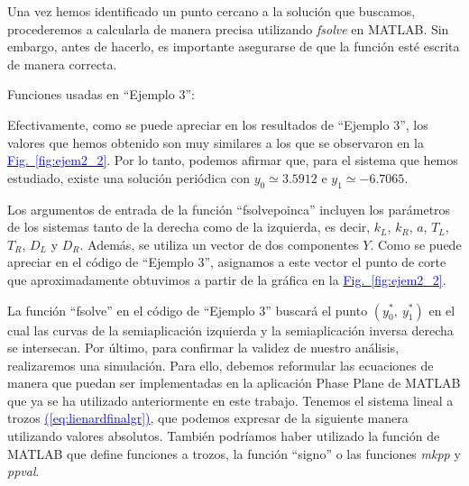 \documentclass[12pt,a4paper]{report} %
\newcommand{\fref}[1]{\hyperref[#1]{\textcolor{blue}{Fig.~\ref*{#1}}}}
\newcommand{\eref}[1]{\hyperref[#1]{\textcolor{blue}{(\ref*{#1})}}}
\newcommand{\fref}[1]{\hyperref[#1]{\textcolor{blue}{\textit{Fig.~\ref*{#1}}}}}
\newcommand{\eref}[1]{\hyperref[#1]{\textcolor{blue}{\textit{(\ref*{#1})}}}}
\begin{document}
	Una vez hemos identificado un punto cercano a la solución que buscamos, procederemos a calcularla de manera precisa utilizando \textit{fsolve} en MATLAB. Sin embargo, antes de hacerlo, es importante asegurarse de que la función esté escrita de manera correcta.
		
	\vspace{1cm}
	
	\vspace{1cm}
	
	\newpage
	
	\noindent Funciones usadas en ``Ejemplo 3'':
	\vspace{0.5cm}
	\vspace{0.5cm}
	
	\vspace{1cm} Efectivamente, como se puede apreciar en los resultados de ``Ejemplo 3'', los valores que hemos obtenido son muy similares a los que se observaron en la \fref{fig:ejem2_2}. Por lo tanto, podemos afirmar que, para el sistema que hemos estudiado, existe una solución periódica con $y_0\simeq3.5912$ e $y_1\simeq-6.7065$.

	
	\vspace{0.5cm}Los argumentos de entrada de la función ``fsolvepoinca'' incluyen los parámetros de los sistemas tanto de la derecha como de la izquierda, es decir, $k_L$, $k_R$, $a$, $T_L$, $T_R$, $D_L$ y $D_R$. Además, se utiliza un vector de dos componentes $Y$. Como se puede apreciar en el código de ``Ejemplo 3'', asignamos a este vector el punto de corte que aproximadamente obtuvimos a partir de la gráfica en la \fref{fig:ejem2_2}.
	
	
	\vspace{0.5cm}La función ``fsolve'' en el código de ``Ejemplo 3'' buscará el punto $\left(y_0^*,\: y_1^*\right)$ en el cual las curvas de la semiaplicación izquierda y la semiaplicación inversa derecha se intersecan.
	\newpage
	Por último, para confirmar la validez de nuestro análisis, realizaremos una simulación. Para ello, debemos reformular las ecuaciones de manera que puedan ser implementadas en la aplicación Phase Plane de MATLAB que ya se ha utilizado anteriormente en este trabajo. Tenemos el sistema lineal a trozos \eref{eq:lienardfinalgr}, que podemos expresar de la siguiente manera utilizando valores absolutos. También podríamos haber utilizado la función de MATLAB que define funciones a trozos, la función ``signo'' o las funciones \textit{mkpp} y \textit{ppval}.
	
\end{document}
